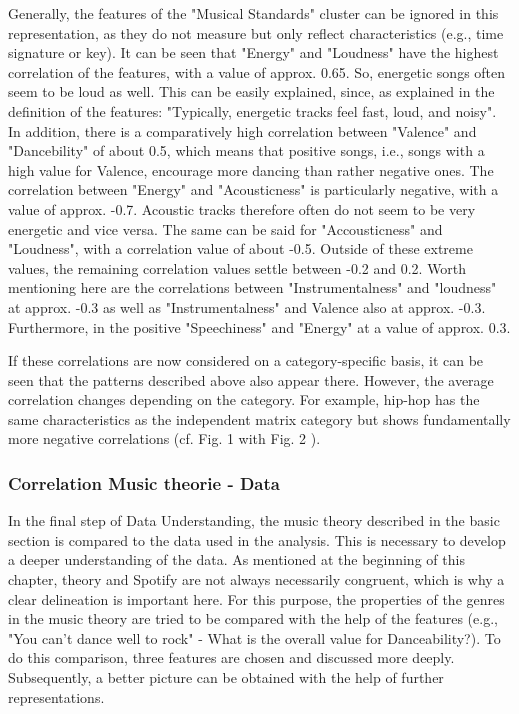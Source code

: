 Generally, the features of the "Musical Standards" cluster can be ignored in this representation, as they do not measure but only reflect characteristics (e.g., time signature or key). It can be seen that "Energy" and "Loudness" have the highest correlation of the features, with a value of approx. 0.65.  So, energetic songs often seem to be loud as well. This can be easily explained, since, as explained in the definition of the features: "Typically, energetic tracks feel fast, loud, and noisy". In addition, there is a comparatively high correlation between "Valence" and "Dancebility" of about 0.5, which means that positive songs, i.e., songs with a high value for Valence, encourage more dancing than rather negative ones. The correlation between "Energy" and "Acousticness" is particularly negative, with a value of approx. -0.7. Acoustic tracks therefore often do not seem to be very energetic and vice versa. The same can be said for "Accousticness" and "Loudness", with a correlation value of about -0.5. Outside of these extreme values, the remaining correlation values settle between -0.2 and 0.2. Worth mentioning here are the correlations between "Instrumentalness" and "loudness" at approx. -0.3 as well as "Instrumentalness" and Valence also at approx. -0.3. Furthermore, in the positive "Speechiness" and "Energy" at a value of approx. 0.3.

If these correlations are now considered on a category-specific basis, it can be seen that the patterns described above also appear there. However, the average correlation changes depending on the category. For example, hip-hop has the same characteristics as the independent matrix category but shows fundamentally more negative correlations (cf. Fig. 1 with Fig. 2 ).

\subsubsection{Correlation Music theorie - Data}
In the final step of Data Understanding, the music theory described in the basic section is compared to the data used in the analysis. This is necessary to develop a deeper understanding of the data. As mentioned at the beginning of this chapter, theory and Spotify are not always necessarily congruent, which is why a clear delineation is important here. For this purpose, the properties of the genres in the music theory are tried to be compared with the help of the features (e.g., "You can't dance well to rock" - What is the overall value for Danceability?). To do this comparison, three features are chosen and discussed more deeply. Subsequently, a better picture can be obtained with the help of further representations.

